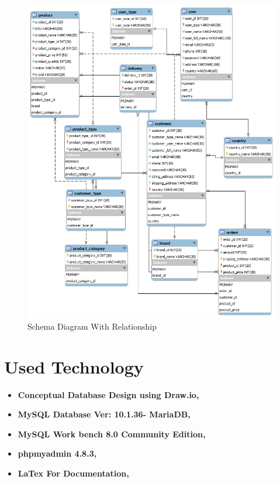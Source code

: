 \documentclass{article}
\begin{document}
		\begin{figure}[h!]
			\centering
			\includegraphics[width=5.3in]{images/schema_with_relationship.png}
			\caption{Schema Diagram With Relationship}
			\label{fig:schema_with_rel}
		\end{figure}
	\pagebreak
	\section{Used Technology}
	
	\begin{itemize}
		\item	\textbf{Conceptual Database Design using Draw.io,\cite{Drawio}}
		\item	\textbf{MySQL Database Ver: 10.1.36- MariaDB,\cite{MySQL} }
		\item	\textbf{MySQL Work bench 8.0 Community Edition,\cite{MySQL_Workbench}}
		\item	\textbf{phpmyadmin 4.8.3,\cite{phpMyAdmin}}
		\item	\textbf{LaTex For Documentation,\cite{LaTex}}
	\end{itemize}
\end{document}
